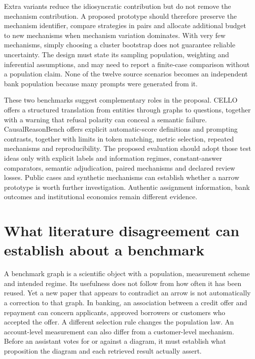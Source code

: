 Extra variants reduce the idiosyncratic contribution but do not remove the
mechanism contribution. A proposed prototype should therefore preserve the
mechanism identifier, compare strategies in pairs and allocate additional
budget to new mechanisms when mechanism variation dominates. With very few
mechanisms, simply choosing a cluster bootstrap does not guarantee reliable
uncertainty. The design must state its sampling population, weighting and
inferential assumptions, and may need to report a finite-case comparison
without a population claim. None of the twelve source scenarios becomes an
independent bank population because many prompts were generated from it.

These two benchmarks suggest complementary roles in the proposal. CELLO
offers a structured translation from entities through graphs to questions,
together with a warning that refusal polarity can conceal a semantic failure.
CausalReasonBench offers explicit automatic-score definitions and prompting
contrasts, together with limits in token matching, metric selection, repeated
mechanisms and reproducibility. The proposed evaluation should adopt those
test ideas only with explicit labels and information regimes, constant-answer
comparators, semantic adjudication, paired mechanisms and declared review
losses. Public cases and synthetic mechanisms can establish whether a narrow
prototype is worth further investigation. Authentic assignment information,
bank outcomes and institutional economics remain different evidence.
\citep{exec17_benchmark_cello,exec17_benchmark_cherif}
\label{exec17:benchmark-development-end}


\section{What literature disagreement can establish about a benchmark}
\label{exec17:validity-development}

A benchmark graph is a scientific object with a population, measurement scheme
and intended regime. Its usefulness does not follow from how often it has been
reused. Yet a new paper that appears to contradict an arrow is not automatically
a correction to that graph. In banking, an association between a credit offer
and repayment can concern applicants, approved borrowers or customers who
accepted the offer. A different selection rule changes the population law.
An account-level measurement can also differ from a customer-level mechanism.
Before an assistant votes for or against a diagram, it must establish what
proposition the diagram and each retrieved result actually assert.

